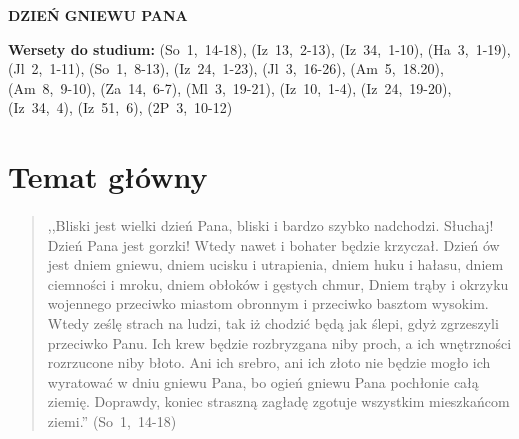 \documentclass[10pt,a4paper,oneside]{article}
\begin{document}
\centerline{\textbf{\MakeUppercase{Dzień gniewu Pana}}}
\begin{center}
\textbf{Wersety do studium:} \mbox{(So 1, 14-18)}, \mbox{(Iz 13, 2-13)}, \mbox{(Iz 34, 1-10)}, \mbox{(Ha 3, 1-19)}, \mbox{(Jl 2, 1-11)}, \mbox{(So 1, 8-13)}, \mbox{(Iz 24, 1-23)}, \mbox{(Jl 3, 16-26)}, \mbox{(Am 5, 18.20)}, \mbox{(Am 8, 9-10)}, \mbox{(Za 14, 6-7)}, \mbox{(Ml 3, 19-21)}, \mbox{(Iz 10, 1-4)}, \mbox{(Iz 24, 19-20)}, \mbox{(Iz 34, 4)}, \mbox{(Iz 51, 6)}, \mbox{(2P 3, 10-12)}
\end{center}
\section{Temat główny}
\paragraph{}
\begin{quote}
,,Bliski jest wielki dzień Pana, bliski i bardzo szybko nadchodzi. Słuchaj! Dzień Pana jest gorzki! Wtedy nawet i bohater będzie krzyczał. Dzień ów jest dniem gniewu, dniem ucisku i utrapienia, dniem huku i hałasu, dniem ciemności i mroku, dniem obłoków i gęstych chmur, Dniem trąby i okrzyku wojennego przeciwko miastom obronnym i przeciwko basztom wysokim. Wtedy ześlę strach na ludzi, tak iż chodzić będą jak ślepi, gdyż zgrzeszyli przeciwko Panu. Ich krew będzie rozbryzgana niby proch, a ich wnętrzności rozrzucone niby błoto. Ani ich srebro, ani ich złoto nie będzie mogło ich wyratować w dniu gniewu Pana, bo ogień gniewu Pana pochłonie całą ziemię. Doprawdy, koniec straszną zagładę zgotuje wszystkim mieszkańcom ziemi.'' \mbox{(So 1, 14-18)}
\end{quote}
\end{document}
